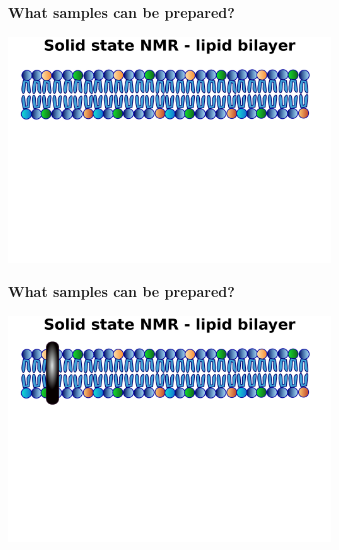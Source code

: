 \documentclass{beamer}
\begin{document}
\addtocounter{framenumber}{-1}
\begin{frame}
\begin{center}
\Large{\centering
\textbf{What samples can be prepared?} \\}

\vspace{0.5cm}

\includegraphics[height=6cm]{plots/samples9.pdf}
\end{center}
\end{frame}


\addtocounter{framenumber}{-1}
\begin{frame}
\begin{center}
\Large{\centering
\textbf{What samples can be prepared?} \\}

\vspace{0.5cm}

\includegraphics[height=6cm]{plots/samples8.pdf}
\end{center}
\end{frame}
\end{document}
